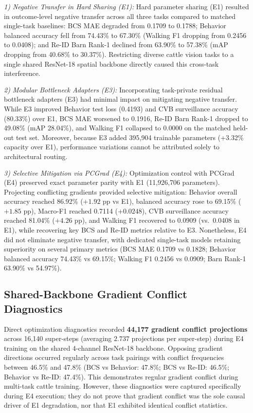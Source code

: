 \documentclass[conference]{IEEEtran}
\begin{document}
\textit{1) Negative Transfer in Hard Sharing (E1):} Hard parameter sharing (E1) resulted in outcome-level negative transfer across all three tasks compared to matched single-task baselines: BCS MAE degraded from 0.1709 to 0.1788; Behavior balanced accuracy fell from 74.43\% to 67.30\% (Walking F1 dropping from 0.2456 to 0.0408); and Re-ID Barn Rank-1 declined from 63.90\% to 57.38\% (mAP dropping from 40.68\% to 30.37\%). Restricting diverse cattle vision tasks to a single shared ResNet-18 spatial backbone directly caused this cross-task interference.

\textit{2) Modular Bottleneck Adapters (E3):} Incorporating task-private residual bottleneck adapters (E3) had minimal impact on mitigating negative transfer. While E3 improved Behavior test loss (0.4193) and CVB surveillance accuracy (80.33\%) over E1, BCS MAE worsened to 0.1916, Re-ID Barn Rank-1 dropped to 49.08\% (mAP 28.04\%), and Walking F1 collapsed to 0.0000 on the matched held-out test set. Moreover, because E3 added 395,904 trainable parameters (+3.32\% capacity over E1), performance variations cannot be attributed solely to architectural routing.

\textit{3) Selective Mitigation via PCGrad (E4):} Optimization control with PCGrad (E4) preserved exact parameter parity with E1 (11,926,706 parameters). Projecting conflicting gradients provided selective mitigation: Behavior overall accuracy reached 86.92\% ($+1.92$ pp vs E1), balanced accuracy rose to 69.15\% ($+1.85$ pp), Macro-F1 reached 0.7114 ($+0.0248$), CVB surveillance accuracy reached 81.04\% ($+4.26$ pp), and Walking F1 recovered to 0.0909 (vs.\ 0.0408 in E1), while recovering key BCS and Re-ID metrics relative to E3. Nonetheless, E4 did not eliminate negative transfer, with dedicated single-task models retaining superiority on several primary metrics (BCS MAE 0.1709 vs 0.1828; Behavior balanced accuracy 74.43\% vs 69.15\%; Walking F1 0.2456 vs 0.0909; Barn Rank-1 63.90\% vs 54.97\%).

\subsection{Shared-Backbone Gradient Conflict Diagnostics}
Direct optimization diagnostics recorded \textbf{44,177 gradient conflict projections} across 16,140 super-steps (averaging $2.737$ projections per super-step) during E4 training on the shared 4-channel ResNet-18 backbone. Opposing gradient directions occurred regularly across task pairings with conflict frequencies between 46.5\% and 47.8\% (BCS vs Behavior: 47.8\%; BCS vs Re-ID: 46.5\%; Behavior vs Re-ID: 47.4\%). This demonstrates regular gradient conflict during multi-task cattle training. However, these diagnostics were captured specifically during E4 execution; they do not prove that gradient conflict was the sole causal driver of E1 degradation, nor that E1 exhibited identical conflict statistics.
\end{document}
